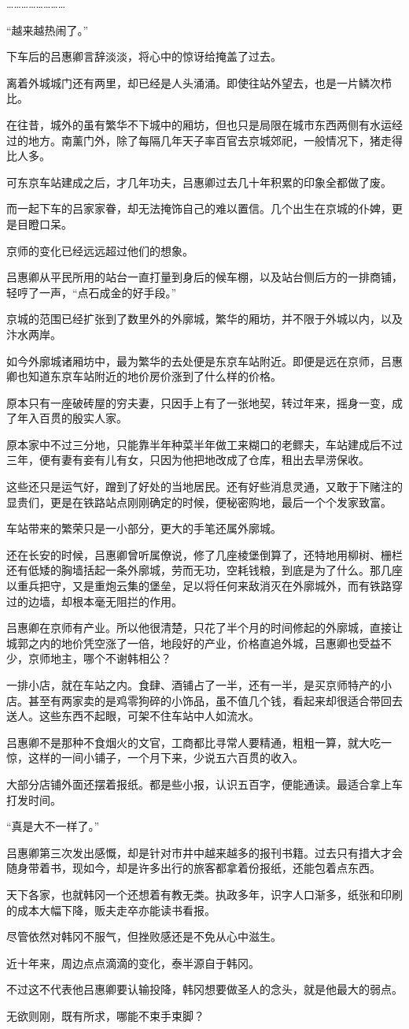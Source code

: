 ……………………

“越来越热闹了。”

下车后的吕惠卿言辞淡淡，将心中的惊讶给掩盖了过去。

离着外城城门还有两里，却已经是人头涌涌。即使往站外望去，也是一片鳞次栉比。

在往昔，城外的虽有繁华不下城中的厢坊，但也只是局限在城市东西两侧有水运经过的地方。南薰门外，除了每隔几年天子率百官去京城郊祀，一般情况下，猪走得比人多。

可东京车站建成之后，才几年功夫，吕惠卿过去几十年积累的印象全都做了废。

而一起下车的吕家家眷，却无法掩饰自己的难以置信。几个出生在京城的仆婢，更是目瞪口呆。

京师的变化已经远远超过他们的想象。

吕惠卿从平民所用的站台一直打量到身后的候车棚，以及站台侧后方的一排商铺，轻哼了一声，“点石成金的好手段。”

京城的范围已经扩张到了数里外的外廓城，繁华的厢坊，并不限于外城以内，以及汴水两岸。

如今外廓城诸厢坊中，最为繁华的去处便是东京车站附近。即便是远在京师，吕惠卿也知道东京车站附近的地价房价涨到了什么样的价格。

原本只有一座破砖屋的穷夫妻，只因手上有了一张地契，转过年来，摇身一变，成了年入百贯的殷实人家。

原本家中不过三分地，只能靠半年种菜半年做工来糊口的老鳏夫，车站建成后不过三年，便有妻有妾有儿有女，只因为他把地改成了仓库，租出去旱涝保收。

这些还只是运气好，蹭到了好处的当地居民。还有好些消息灵通，又敢于下赌注的显贵们，更是在铁路站点刚刚确定的时候，便秘密购地，最后一个个发家致富。

车站带来的繁荣只是一小部分，更大的手笔还属外廓城。

还在长安的时候，吕惠卿曾听属僚说，修了几座棱堡倒算了，还特地用柳树、栅栏还有低矮的胸墙括起一条外廓城，劳而无功，空耗钱粮，到底是为了什么。那几座以重兵把守，又是重炮云集的堡垒，足以将任何来敌消灭在外廓城外，而有铁路穿过的边墙，却根本毫无阻拦的作用。

吕惠卿在京师有产业。所以他很清楚，只花了半个月的时间修起的外廓城，直接让城郭之内的地价凭空涨了一倍，地段好的产业，价格直追外城，吕惠卿也受益不少，京师地主，哪个不谢韩相公？

一排小店，就在车站之内。食肆、酒铺占了一半，还有一半，是买京师特产的小店。甚至有两家卖的是鸡零狗碎的小饰品，虽不值几个钱，看起来却很适合带回去送人。这些东西不起眼，可架不住车站中人如流水。

吕惠卿不是那种不食烟火的文官，工商都比寻常人要精通，粗粗一算，就大吃一惊，这样的一间小铺子，一个月下来，少说五六百贯的收入。

大部分店铺外面还摆着报纸。都是些小报，认识五百字，便能通读。最适合拿上车打发时间。

“真是大不一样了。”

吕惠卿第三次发出感慨，却是针对市井中越来越多的报刊书籍。过去只有措大才会随身带着书，现如今，却是许多出行的旅客都拿着份报纸，还能包着点东西。

天下各家，也就韩冈一个还想着有教无类。执政多年，识字人口渐多，纸张和印刷的成本大幅下降，贩夫走卒亦能读书看报。

尽管依然对韩冈不服气，但挫败感还是不免从心中滋生。

近十年来，周边点点滴滴的变化，泰半源自于韩冈。

不过这不代表他吕惠卿要认输投降，韩冈想要做圣人的念头，就是他最大的弱点。

无欲则刚，既有所求，哪能不束手束脚？
